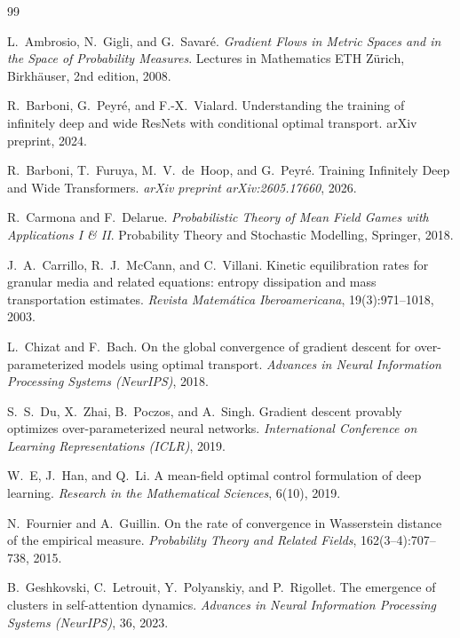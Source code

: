 \documentclass[11pt,a4wide]{article}
\theoremstyle{definition}
\begin{document}
\begin{thebibliography}{99}

 L.~Ambrosio, N.~Gigli, and G.~Savar\'e. \emph{Gradient Flows in Metric Spaces and in the Space of Probability Measures}. Lectures in Mathematics ETH Z\"urich, Birkh\"auser, 2nd edition, 2008.

 R.~Barboni, G.~Peyr\'e, and F.-X.~Vialard. Understanding the training of infinitely deep and wide ResNets with conditional optimal transport. arXiv preprint, 2024.

 R.~Barboni, T.~Furuya, M.~V.~de~Hoop, and G.~Peyr\'e. Training Infinitely Deep and Wide Transformers. \emph{arXiv preprint arXiv:2605.17660}, 2026.

 R.~Carmona and F.~Delarue. \emph{Probabilistic Theory of Mean Field Games with Applications I \& II}. Probability Theory and Stochastic Modelling, Springer, 2018.

 J.~A.~Carrillo, R.~J.~McCann, and C.~Villani. Kinetic equilibration rates for granular media and related equations: entropy dissipation and mass transportation estimates. \emph{Revista Matem\'atica Iberoamericana}, 19(3):971--1018, 2003.

 L.~Chizat and F.~Bach. On the global convergence of gradient descent for over-parameterized models using optimal transport. \emph{Advances in Neural Information Processing Systems (NeurIPS)}, 2018.

 S.~S.~Du, X.~Zhai, B.~Poczos, and A.~Singh. Gradient descent provably optimizes over-parameterized neural networks. \emph{International Conference on Learning Representations (ICLR)}, 2019.

 W.~E, J.~Han, and Q.~Li. A mean-field optimal control formulation of deep learning. \emph{Research in the Mathematical Sciences}, 6(10), 2019.

 N.~Fournier and A.~Guillin. On the rate of convergence in Wasserstein distance of the empirical measure. \emph{Probability Theory and Related Fields}, 162(3--4):707--738, 2015.

 B.~Geshkovski, C.~Letrouit, Y.~Polyanskiy, and P.~Rigollet. The emergence of clusters in self-attention dynamics. \emph{Advances in Neural Information Processing Systems (NeurIPS)}, 36, 2023.


\end{thebibliography}
\end{document}

